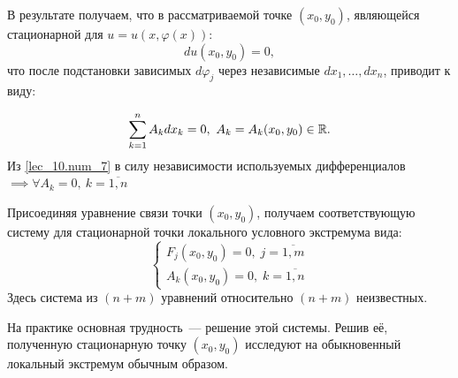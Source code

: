 \documentclass[../../main.tex]{subfiles}
\begin{document}
В результате получаем, что в рассматриваемой точке $(x_0, y_0)$,
являющейся стационарной для $u = u\left( x, \varphi(x) \right)$:
\[ du(x_0, y_0) = 0, \]
что после подстановки зависимых $d\varphi_j$ через независимые 
$dx_1, \ldots, dx_n$, приводит к виду:

\begin{equation} \label{lec_10.num_7}
	\sum_{k = 1}^{n} A_k dx_k = 0,\ A_k = A_k(x_0, y_0) \in \mathbb{R}.
\end{equation}
Из \eqref{lec_10.num_7} в силу независимости используемых дифференциалов 
$\implies \forall A_k = 0,\ k = \overline{1, n}$

Присоединяя уравнение связи точки $(x_0, y_0)$, получаем 
соответствующую систему для стационарной точки локального 
условного экстремума вида:
\[ \begin{cases}
	F_j(x_0, y_0) = 0, \; j = \overline{1, m} \\
	A_k(x_0, y_0) = 0, \; k = \overline{1, n}
\end{cases} \]
Здесь система из $(n+m)$ уравнений относительно $(n+m)$ неизвестных.

На практике основная трудность~--- решение этой системы.
Решив её, полученную стационарную точку $(x_0, y_0)$ исследуют
на обыкновенный локальный экстремум обычным образом.
\end{document}
